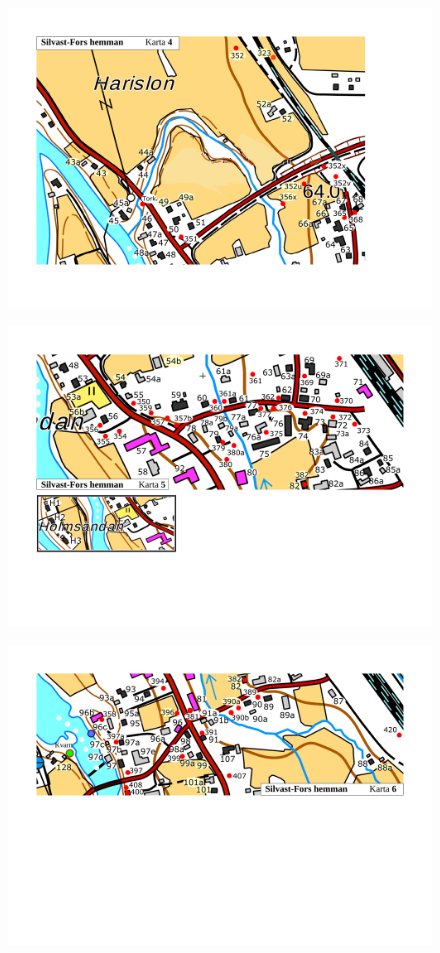 \begin{figure}[htbp]
  \centering
  \includegraphics[width=1\textwidth]{kartor/Karta4.pdf}
  \label{map:4}
\end{figure}

\begin{figure}[htbp]
  \centering
  \includegraphics[width=1\textwidth]{kartor/Karta5.pdf}
  \label{map:5}
\end{figure}

\begin{figure}[htbp]
  \centering
  \includegraphics[width=1\textwidth]{kartor/Karta6.pdf}
  \label{map:6}
\end{figure}

